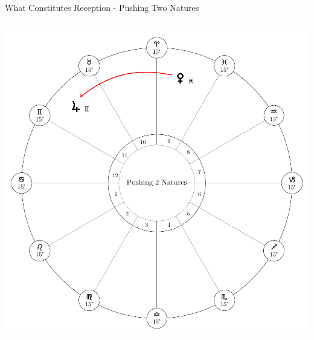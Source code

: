 \begin{frame}[t]{What Constitutes Reception - Pushing Two Natures}
\begin{columns}[T, onlytextwidth]
\vspace{-0.5cm}
\begin{center}
{\includegraphics[width=\textwidth]{charts/01-pushing-two-natures}} \\
\end{center}

\end{columns}
\end{frame}

